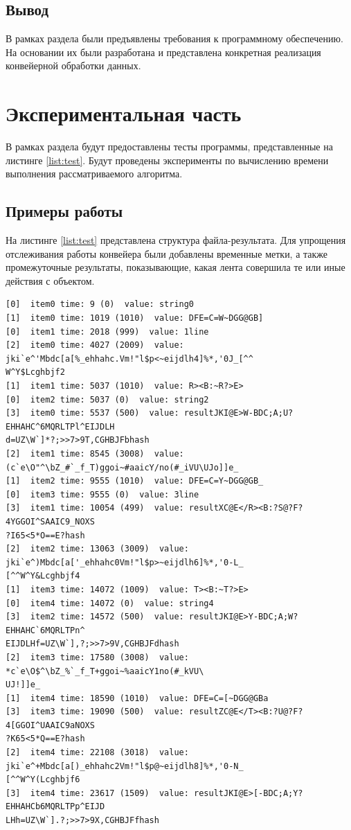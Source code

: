 \documentclass[a4paper,12pt]{report}
\begin{document}
	\section{Вывод}
	
	В рамках раздела были предъявлены требования к программному обеспечению. 
	На основании их были разработана и представлена конкретная реализация конвейерной обработки данных.

    \newpage

    \chapter{Экспериментальная часть}
        \label{sec:experimental_part}

			В рамках раздела будут предоставлены тесты программы, представленные на листинге \ref{list:test}. 
			Будут проведены эксперименты по вычислению времени выполнения рассматриваемого алгоритма.

	\section{Примеры работы}

        	На листинге \ref{list:test} представлена структура файла-результата. 
        	Для упрощения отслеживания работы конвейера были добавлены временные метки, а также промежуточные результаты, показывающие, какая лента совершила те или иные действия с объектом.

		\begin{lstlisting}[frame = single, label=list:test, caption= Файл с результатом]
[0]  item0 time: 9 (0)  value: string0
[1]  item0 time: 1019 (1010)  value: DFE=C=W~DGG@GB]
[0]  item1 time: 2018 (999)  value: 1line
[2]  item0 time: 4027 (2009)  value: jki`e^'Mbdc[a[%_ehhahc.Vm!"l$p<~eijdlh4]%*,'0J_[^^
W^Y$Lcghbjf2
[1]  item1 time: 5037 (1010)  value: R><B:~R?>E>
[0]  item2 time: 5037 (0)  value: string2
[3]  item0 time: 5537 (500)  value: resultJKI@E>W-BDC;A;U?EHHAHC^6MQRLTPl^EIJDLH
d=UZ\W`]*?;>>7>9T,CGHBJFbhash
[2]  item1 time: 8545 (3008)  value: (c`e\O"^\bZ_#`_f_T)ggoi~#aaicY/no(#_iVU\UJo]]e_
[1]  item2 time: 9555 (1010)  value: DFE=C=Y~DGG@GB_
[0]  item3 time: 9555 (0)  value: 3line
[3]  item1 time: 10054 (499)  value: resultXC@E</R><B:?S@?F?4YGGOI^SAAIC9_NOXS
?I65<5*O==E?hash
[2]  item2 time: 13063 (3009)  value: jki`e^)Mbdc[a['_ehhahc0Vm!"l$p>~eijdlh6]%*,'0-L_
[^^W^Y&Lcghbjf4
[1]  item3 time: 14072 (1009)  value: T><B:~T?>E>
[0]  item4 time: 14072 (0)  value: string4
[3]  item2 time: 14572 (500)  value: resultJKI@E>Y-BDC;A;W?EHHAHC`6MQRLTPn^
EIJDLHf=UZ\W`],?;>>7>9V,CGHBJFdhash
[2]  item3 time: 17580 (3008)  value: *c`e\O$^\bZ_%`_f_T+ggoi~%aaicY1no(#_kVU\
UJ!]]e_
[1]  item4 time: 18590 (1010)  value: DFE=C=[~DGG@GBa
[3]  item3 time: 19090 (500)  value: resultZC@E</T><B:?U@?F?4[GGOI^UAAIC9aNOXS
?K65<5*Q==E?hash
[2]  item4 time: 22108 (3018)  value: jki`e^+Mbdc[a[)_ehhahc2Vm!"l$p@~eijdlh8]%*,'0-N_
[^^W^Y(Lcghbjf6
[3]  item4 time: 23617 (1509)  value: resultJKI@E>[-BDC;A;Y?EHHAHCb6MQRLTPp^EIJD
LHh=UZ\W`].?;>>7>9X,CGHBJFfhash
		\end{lstlisting}
		
\end{document}
